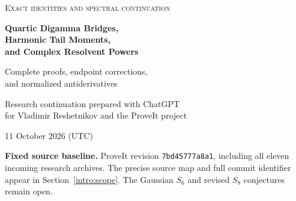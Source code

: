\documentclass[11pt,a4paper]{article}
\numberwithin{equation}{section}
\theoremstyle{definition}
\theoremstyle{remark}
\newcommand{\shortsnapshot}{\texttt{7bd45777a8a1}}
\begin{document}
\begin{titlepage}
\thispagestyle{empty}
\vspace*{10mm}
\begin{center}
{\small\scshape Exact identities and spectral continuation\par}
\vspace{10mm}
{\LARGE\bfseries Quartic Digamma Bridges,\\[4pt]
Harmonic Tail Moments,\\[4pt]
and Complex Resolvent Powers\par}
\vspace{8mm}
{\large Complete proofs, endpoint corrections,\\
and normalized antiderivatives\par}
\vspace{10mm}
{Research continuation prepared with ChatGPT\\
for Vladimir Reshetnikov and the ProveIt project\par}
\vspace{3mm}
{11 October 2026 (UTC)\par}
\end{center}
\vspace{7mm}
\begin{abstract}
We resolve three concrete parts of the current ProveIt research agenda.
First, we evaluate the coordinate finite part of the fourth power of
the digamma function through the linear Laurent coefficient of the
strict depth-three harmonic zeta function, with every lower-depth and
endpoint correction explicit. A normally convergent global
partial-fraction identity supplies a normalized primitive and an
all-order polygamma hierarchy. Second, we evaluate every centered
nonpositive even moment of a product of two even harmonic tails by a
finite Bernoulli formula. For each pair of tail orders the entire
moment sequence belongs to one fixed span of ordinary zeta values and
products, and its convergent generating function reduces to finitely
many classical polylogarithms. The first mixed pair is generated
rationally by its first four moments. Third, we extend the cotangent
resolvent transform to arbitrary complex powers and complete its joint
Stieltjes germ at every integer power. The completion includes a finite
endpoint term that remains nonzero when the apparent pole is removable.
It gives all logarithmic powers, exact parameter derivatives, and
normalized primitives. An independent Gamma--Gauss generator evaluates
all ordinary polynomial moments. We separate these proofs from
computational diagnostics, record the source audit, and identify the
remaining arithmetic and higher-depth questions.
\end{abstract}
\vfill
\noindent\textbf{Fixed source baseline.} ProveIt revision
\shortsnapshot, including all eleven incoming research archives.
The precise source map and full commit identifier appear in
Section~\ref{intro:scope}. The Gaussian $S_6$ and revised $S_8$
conjectures remain open.
\end{titlepage}
{\footnotesize\setlength{\parskip}{0pt}\tableofcontents}
\clearpage
\end{document}
